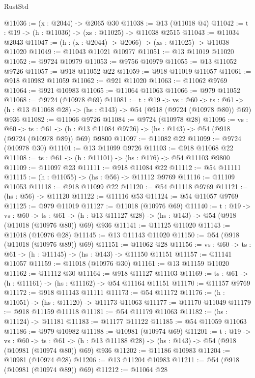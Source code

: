 \begin{lexlean}{RustStd}
\begin{coremodule}
@11036 := (x : @2044) -> @2065 @30
@11038 := @13 (@11018 @4)
@11042 := {t : @19} -> (h : @11036) -> (xs : @11025) -> @11038 @2515
@11043 := @11034 @2043
@11047 := (h : (x : @2044) -> @2066) -> (xs : @11025) -> @11038 @11020
@11049 := @11043 @11021 @10977
@11051 := @13 @11019 @11020
@11052 := @9724 @10979
@11053 := @9756 @10979
@11055 := @13 @11052 @9726
@11057 := @918 @11052 @22
@11059 := @918 @11019 @11057
@11061 := @918 @10982 @11059
@11062 := @921 @11020
@11063 := @11062 @9769
@11064 := @921 @10983
@11065 := @11064 @11063
@11066 := @979 @11052
@11068 := @9724 (@10978 @69)
@11081 := {t : @19} ->
  {vs : @60} ->
  {ts : @61} -> (h : @13 @11068 @28) -> (hs : @143) -> @54 (@918 (@9724 (@10978 @80)) @69) @936
@11082 := @11066 @9726
@11084 := @9724 (@10978 @28)
@11096 := {vs : @60} ->
  {ts : @61} -> (h : @13 @11084 @9726) -> (hs : @143) -> @54 (@918 (@9724 (@10978 @89)) @69) @9800
@11097 := @11082 @22
@11099 := @9724 (@10978 @30)
@11101 := @13 @11099 @9726
@11103 := @918 @11068 @22
@11108 := {ts : @61} -> (h : @11101) -> (hs : @176) -> @54 @11103 @9800
@11109 := @11097 @23
@11111 := @918 @11084 @22
@11112 := @54 @11111
@11115 := (h : @11055) -> (hs : @56) -> @11112 @9769
@11116 := @11109 @11053
@11118 := @918 @11099 @22
@11120 := @54 @11118 @9769
@11121 := (hs : @56) -> @11120
@11122 := @11116 @53
@11124 := @54 @11057 @9769
@11125 := @979 @11019
@11127 := @11018 (@10976 @69)
@11140 := {t : @19} ->
  {vs : @60} ->
  {ts : @61} -> (h : @13 @11127 @28) -> (hs : @143) -> @54 (@918 (@11018 (@10976 @80)) @69) @936
@11141 := @11125 @11020
@11143 := @11018 (@10976 @28)
@11145 := @13 @11143 @11020
@11150 := @54 (@918 (@11018 (@10976 @89)) @69)
@11151 := @11062 @28
@11156 := {vs : @60} -> {ts : @61} -> (h : @11145) -> (hs : @143) -> @11150 @11151
@11157 := @11141 @11057
@11159 := @11018 (@10976 @30)
@11161 := @13 @11159 @11020
@11162 := @11112 @30
@11164 := @918 @11127 @11103
@11169 := {ts : @61} -> (h : @11161) -> (hs : @11162) -> @54 @11164 @11151
@11170 := @11157 @9769
@11172 := @918 @11143 @11111
@11173 := @54 @11172
@11176 := (h : @11051) -> (hs : @11120) -> @11173 @11063
@11177 := @11170 @11049
@11179 := @918 @11159 @11118
@11181 := @54 @11179 @11063
@11182 := (hs : @11124) -> @11181
@11183 := @11177 @11122
@11185 := @54 @11059 @11063
@11186 := @979 @10982
@11188 := @10981 (@10974 @69)
@11201 := {t : @19} ->
  {vs : @60} ->
  {ts : @61} -> (h : @13 @11188 @28) -> (hs : @143) -> @54 (@918 (@10981 (@10974 @80)) @69) @936
@11202 := @11186 @10983
@11204 := @10981 (@10974 @28)
@11206 := @13 @11204 @10983
@11211 := @54 (@918 (@10981 (@10974 @89)) @69)
@11212 := @11064 @28

\end{coremodule}
\end{lexlean}
